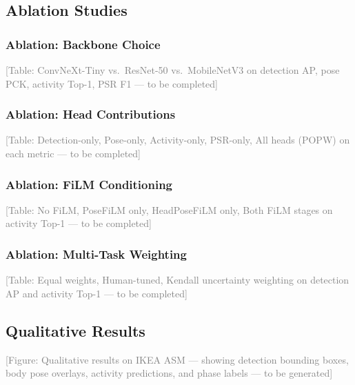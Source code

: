\documentclass[11pt,a4paper]{article}
\begin{document}
\FloatBarrier

\subsection{Ablation Studies}
\label{sec:ablation}

\subsubsection{Ablation: Backbone Choice}
\label{sec:ablation-backbone}
\textcolor{gray}{[Table: ConvNeXt-Tiny vs.\ ResNet-50 vs.\ MobileNetV3 on detection AP, pose PCK, activity Top-1, PSR F1 --- to be completed]}

\subsubsection{Ablation: Head Contributions}
\label{sec:ablation-heads}
\textcolor{gray}{[Table: Detection-only, Pose-only, Activity-only, PSR-only, All heads (POPW) on each metric --- to be completed]}

\subsubsection{Ablation: FiLM Conditioning}
\label{sec:ablation-film}
\textcolor{gray}{[Table: No FiLM, PoseFiLM only, HeadPoseFiLM only, Both FiLM stages on activity Top-1 --- to be completed]}

\subsubsection{Ablation: Multi-Task Weighting}
\label{sec:ablation-mtl}
\textcolor{gray}{[Table: Equal weights, Human-tuned, Kendall uncertainty weighting on detection AP and activity Top-1 --- to be completed]}

\FloatBarrier

\subsection{Qualitative Results}
\label{sec:qualitative}

\textcolor{gray}{[Figure: Qualitative results on IKEA ASM --- showing detection bounding boxes, body pose overlays, activity predictions, and phase labels --- to be generated]}
\end{document}
